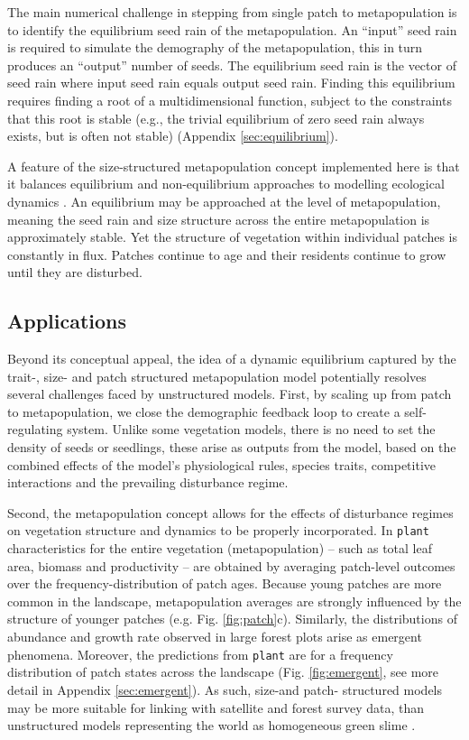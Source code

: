 \documentclass[a4paper,11pt]{article}
\newcommand{\plant}{\texttt{plant}}
\begin{document}
The main numerical challenge in stepping from single patch to
metapopulation is to identify the equilibrium seed rain of the
metapopulation. An ``input'' seed rain is required to simulate 
the demography of the metapopulation, this in turn produces an ``output'' 
number of seeds. The equilibrium seed rain is the vector of seed 
rain where input seed
rain equals output seed rain. Finding this equilibrium requires
finding a root of a multidimensional function, subject to the
constraints that this root is stable (e.g., the trivial equilibrium of
zero seed rain always exists, but is often not stable) (Appendix
\ref{sec:equilibrium}).

A feature of the size-structured metapopulation concept implemented here
is that it balances equilibrium and non-equilibrium approaches to
modelling ecological dynamics \citep{Kohyama-1993, Moorcroft-2001, 
Falster-2011}. An
equilibrium may be approached at the level of metapopulation, meaning
the seed rain and size structure across the entire metapopulation is
approximately stable. Yet the structure of vegetation within individual
patches is constantly in flux. Patches continue to age and their
residents continue to grow until they are disturbed.

\subsection{Applications}


Beyond its conceptual appeal, the idea of a dynamic equilibrium captured by
the trait-, size- and patch structured metapopulation model potentially
resolves several challenges faced by unstructured models. First, by scaling up
from patch to metapopulation, we close the demographic feedback loop to create
a self-regulating system. Unlike some vegetation models, there is no need to
set the density of seeds or seedlings, these arise as outputs from the model,
based on the combined effects of the model's physiological rules, species
traits, competitive interactions and the prevailing disturbance regime.

Second, the metapopulation concept allows for the effects of disturbance
regimes on vegetation structure and dynamics to be properly incorporated. In
{\plant} characteristics for the entire vegetation (metapopulation) -- such
as total leaf area, biomass and productivity -- are obtained by averaging
patch-level outcomes over the frequency-distribution of patch ages. Because
young patches are more common in the landscape, metapopulation averages are
strongly influenced by the structure of younger patches (e.g. 
Fig. \ref{fig:patch}c).  Similarly, the distributions of  abundance and growth rate
observed in large forest  plots \citep[e.g.][]{Muller-2006, Coomes-2007} arise
as  emergent phenomena. Moreover, the predictions from {\plant} 
are for a frequency distribution of patch states across the landscape 
(Fig. \ref{fig:emergent}, see more detail in Appendix \ref{sec:emergent}). As such,
size-and patch- structured models may be more suitable for linking with 
satellite and forest survey data, than unstructured models representing the 
world as homogeneous green slime \citep{Moorcroft-2001, Purves-2008}.  
\end{document}
